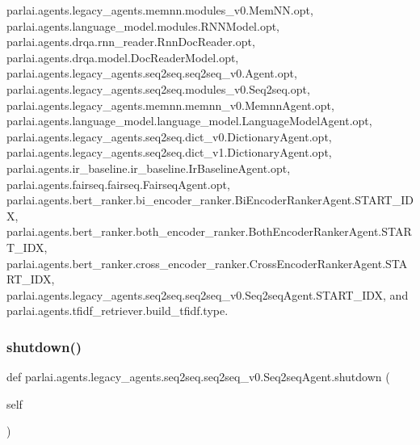 parlai.\+agents.\+legacy\+\_\+agents.\+memnn.\+modules\+\_\+v0.\+Mem\+N\+N.\+opt, parlai.\+agents.\+language\+\_\+model.\+modules.\+R\+N\+N\+Model.\+opt, parlai.\+agents.\+drqa.\+rnn\+\_\+reader.\+Rnn\+Doc\+Reader.\+opt, parlai.\+agents.\+drqa.\+model.\+Doc\+Reader\+Model.\+opt, parlai.\+agents.\+legacy\+\_\+agents.\+seq2seq.\+seq2seq\+\_\+v0.\+Agent.\+opt, parlai.\+agents.\+legacy\+\_\+agents.\+seq2seq.\+modules\+\_\+v0.\+Seq2seq.\+opt, parlai.\+agents.\+legacy\+\_\+agents.\+memnn.\+memnn\+\_\+v0.\+Memnn\+Agent.\+opt, parlai.\+agents.\+language\+\_\+model.\+language\+\_\+model.\+Language\+Model\+Agent.\+opt, parlai.\+agents.\+legacy\+\_\+agents.\+seq2seq.\+dict\+\_\+v0.\+Dictionary\+Agent.\+opt, parlai.\+agents.\+legacy\+\_\+agents.\+seq2seq.\+dict\+\_\+v1.\+Dictionary\+Agent.\+opt, parlai.\+agents.\+ir\+\_\+baseline.\+ir\+\_\+baseline.\+Ir\+Baseline\+Agent.\+opt, parlai.\+agents.\+fairseq.\+fairseq.\+Fairseq\+Agent.\+opt, parlai.\+agents.\+bert\+\_\+ranker.\+bi\+\_\+encoder\+\_\+ranker.\+Bi\+Encoder\+Ranker\+Agent.\+S\+T\+A\+R\+T\+\_\+\+I\+DX, parlai.\+agents.\+bert\+\_\+ranker.\+both\+\_\+encoder\+\_\+ranker.\+Both\+Encoder\+Ranker\+Agent.\+S\+T\+A\+R\+T\+\_\+\+I\+DX, parlai.\+agents.\+bert\+\_\+ranker.\+cross\+\_\+encoder\+\_\+ranker.\+Cross\+Encoder\+Ranker\+Agent.\+S\+T\+A\+R\+T\+\_\+\+I\+DX, parlai.\+agents.\+legacy\+\_\+agents.\+seq2seq.\+seq2seq\+\_\+v0.\+Seq2seq\+Agent.\+S\+T\+A\+R\+T\+\_\+\+I\+DX, and parlai.\+agents.\+tfidf\+\_\+retriever.\+build\+\_\+tfidf.\+type.

\mbox{\label{classparlai_1_1agents_1_1legacy__agents_1_1seq2seq_1_1seq2seq__v0_1_1Seq2seqAgent_a86c41e705170f0b2e56a5bbc378aead9}} 
\subsubsection{\texorpdfstring{shutdown()}{shutdown()}}
{\footnotesize\ttfamily def parlai.\+agents.\+legacy\+\_\+agents.\+seq2seq.\+seq2seq\+\_\+v0.\+Seq2seq\+Agent.\+shutdown (\begin{DoxyParamCaption}\item[{}]{self }\end{DoxyParamCaption})}

